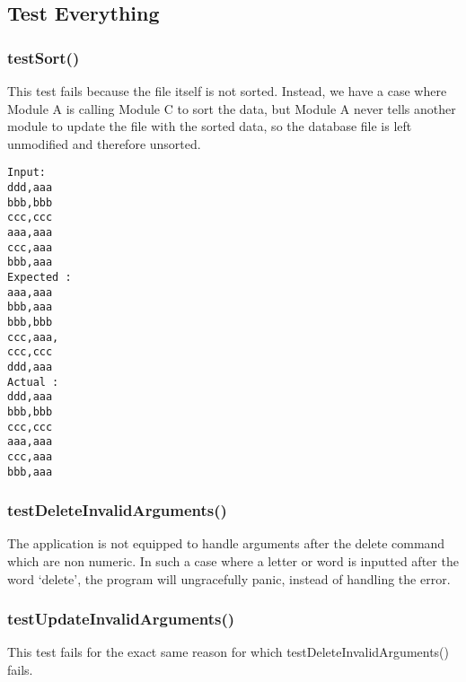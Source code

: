 \subsection{Test Everything}
\subsubsection{testSort()}
This test fails because the file itself is not sorted. Instead, we have a case
where Module A is calling Module C to sort the data, but Module A never tells
another module to update the file with the sorted data, so the database file is
left unmodified and therefore unsorted.

\begin{verbatim}
Input:
ddd,aaa
bbb,bbb
ccc,ccc
aaa,aaa
ccc,aaa
bbb,aaa
Expected :
aaa,aaa
bbb,aaa
bbb,bbb
ccc,aaa,
ccc,ccc
ddd,aaa
Actual :
ddd,aaa
bbb,bbb
ccc,ccc
aaa,aaa
ccc,aaa
bbb,aaa
\end{verbatim}

\subsubsection{testDeleteInvalidArguments()}
The application is not equipped to handle arguments after the delete command
which are non numeric. In such a case where a letter or word is inputted after
the word `delete', the program will ungracefully panic, instead of handling the
error.

\subsubsection{testUpdateInvalidArguments()}
This test fails for the exact same reason for which
testDeleteInvalidArguments() fails.


